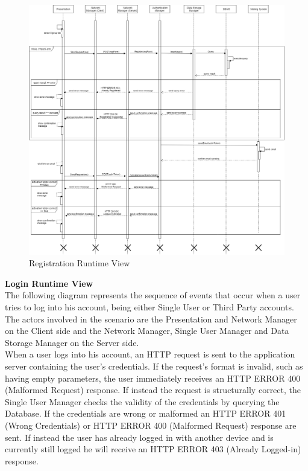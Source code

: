 \documentclass[titlepage]{article}
\begin{document}
\begin{figure}[H]
	\center
  	\includegraphics[width=15cm]{Registration.png}
  	\caption{Registration Runtime View}
 	\label{fig:REG}
\end{figure}

{\bf Login Runtime View }\\ 
The following diagram represents the sequence of events that occur when a user tries to log into his account, being either Single User or Third Party accounts. The actors involved in the scenario are the Presentation and Network Manager on the Client side and the Network Manager, Single User Manager and Data Storage Manager on the Server side. \\
When a user logs into his account, an HTTP request is sent to the application server containing the user’s credentials. If the request’s format is invalid, such as having empty parameters, the user immediately receives an HTTP ERROR 400 (Malformed Request) response. If instead the request is structurally correct, the Single User Manager checks the validity of the credentials by querying the Database. If the credentials are wrong or malformed an HTTP ERROR 401 (Wrong Credentials) or HTTP ERROR 400 (Malformed Request) response are sent. If instead the user has already logged in with another device and is currently still logged he will receive an HTTP ERROR 403 (Already Logged-in) response.\\
\end{document}
